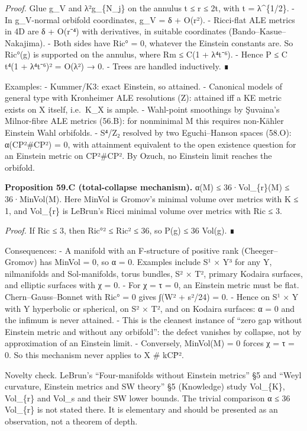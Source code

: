\documentclass[
  10pt,
]{report}
\begin{document}
\emph{Proof.} Glue g\_V and λ²g\_\{N\_j\} on the annulus t ≤ r ≤ 2t,
with t = λ\^{}\{1/2\}. - In g\_V-normal orbifold coordinates, g\_V = δ +
O(r²). - Ricci-flat ALE metrics in 4D are δ + O(r⁻⁴) with derivatives,
in suitable coordinates (Bando--Kasue--Nakajima). - Both sides have Ric°
= 0, whatever the Einstein constants are. So Ric°(g) is supported on the
annulus, where \textbar Rm\textbar{} ≤ C(1 + λ⁴t⁻⁶). - Hence P ≤ C t⁴(1
+ λ⁴t⁻⁶)² = O(λ²) → 0. - Trees are handled inductively. ∎

Examples: - Kummer/K3: exact Einstein, so attained. - Canonical models
of general type with Kronheimer ALE resolutions (Z): attained iff a KE
metric exists on X itself, i.e.~K\_X is ample. - Wahl-point smoothings
by Şuvaina's Milnor-fibre ALE metrics (56.B): for nonminimal M this
requires non-Kähler Einstein Wahl orbifolds. - S⁴/Z₂ resolved by two
Eguchi--Hanson spaces (58.O): α(CP²\#CP²) = 0, with attainment
equivalent to the open existence question for an Einstein metric on
CP²\#CP². By Ozuch, no Einstein limit reaches the orbifold.

\textbf{Proposition 59.C (total-collapse mechanism).} α(M) ≤
36·Vol\_\{\textbar r\textbar\}(M) ≤ 36·MinVol(M). Here MinVol is
Gromov's minimal volume over metrics with \textbar K\textbar{} ≤ 1, and
Vol\_\{\textbar r\textbar\} is LeBrun's Ricci minimal volume over
metrics with \textbar Ric\textbar{} ≤ 3.

\emph{Proof.} If \textbar Ric\textbar{} ≤ 3, then \textbar Ric°\textbar²
≤ \textbar Ric\textbar² ≤ 36, so P(g) ≤ 36 Vol(g). ∎

Consequences: - A manifold with an F-structure of positive rank
(Cheeger--Gromov) has MinVol = 0, so α = 0. Examples include S¹ × Y³ for
any Y, nilmanifolds and Sol-manifolds, torus bundles, S² × T², primary
Kodaira surfaces, and elliptic surfaces with χ = 0. - For χ = τ = 0, an
Einstein metric must be flat. Chern--Gauss--Bonnet with Ric° = 0 gives
∫(\textbar W\textbar² + s²/24) = 0. - Hence on S¹ × Y with Y hyperbolic
or spherical, on S² × T², and on Kodaira surfaces: α = 0 and the infimum
is never attained. - This is the cleanest instance of ``zero gap without
Einstein metric and without any orbifold'': the defect vanishes by
collapse, not by approximation of an Einstein limit. - Conversely,
MinVol(M) = 0 forces χ = τ = 0. So this mechanism never applies to X \#
kCP̄².

Novelty check. LeBrun's ``Four-manifolds without Einstein metrics'' §5
and ``Weyl curvature, Einstein metrics and SW theory'' §5 (Knowledge)
study Vol\_\{\textbar K\textbar\}, Vol\_\{\textbar r\textbar\} and
Vol\_s and their SW lower bounds. The trivial comparison α ≤ 36
Vol\_\{\textbar r\textbar\} is not stated there. It is elementary and
should be presented as an observation, not a theorem of depth.
\end{document}
